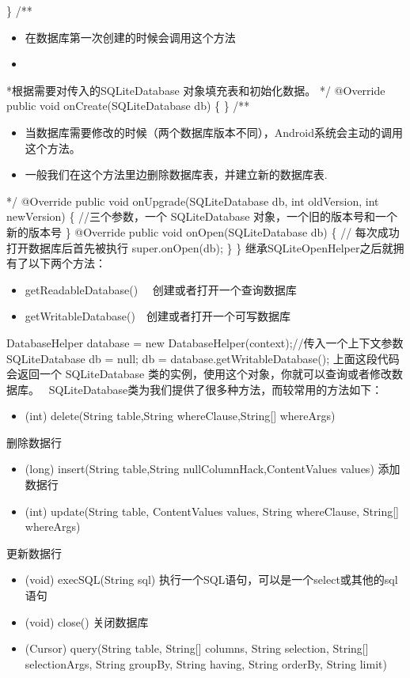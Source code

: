 \documentclass[9pt, b5paper]{article}
\begin{document}
\}
/**
\begin{itemize}
\item 在数据库第一次创建的时候会调用这个方法
\item 
\end{itemize}
 *根据需要对传入的SQLiteDatabase 对象填充表和初始化数据。
 */
@Override
public void onCreate(SQLiteDatabase db) \{
\}
/**
\begin{itemize}
\item 当数据库需要修改的时候（两个数据库版本不同），Android系统会主动的调用这个方法。
\item 一般我们在这个方法里边删除数据库表，并建立新的数据库表.
\end{itemize}
     */
    @Override
    public void onUpgrade(SQLiteDatabase db, int oldVersion, int newVersion) \{
        //三个参数，一个 SQLiteDatabase 对象，一个旧的版本号和一个新的版本号
    \}
    @Override
    public void onOpen(SQLiteDatabase db) \{
        // 每次成功打开数据库后首先被执行
        super.onOpen(db);
    \}
\}
继承SQLiteOpenHelper之后就拥有了以下两个方法：
\begin{itemize}
\item getReadableDatabase() 　创建或者打开一个查询数据库
\item getWritableDatabase()　创建或者打开一个可写数据库
\end{itemize}
DatabaseHelper database = new DatabaseHelper(context);//传入一个上下文参数
SQLiteDatabase db = null;
db = database.getWritableDatabase();
上面这段代码会返回一个 SQLiteDatabase 类的实例，使用这个对象，你就可以查询或者修改数据库。　
SQLiteDatabase类为我们提供了很多种方法，而较常用的方法如下：
\begin{itemize}
\item (int) delete(String table,String whereClause,String[] whereArgs)
\end{itemize}
删除数据行
\begin{itemize}
\item (long) insert(String table,String nullColumnHack,ContentValues values)
添加数据行
\item (int) update(String table, ContentValues values, String whereClause, String[] whereArgs)
\end{itemize}
更新数据行
\begin{itemize}
\item (void) execSQL(String sql)
执行一个SQL语句，可以是一个select或其他的sql语句
\item (void) close()
关闭数据库
\item (Cursor) query(String table, String[] columns, String selection, String[] selectionArgs, String groupBy, String having, String orderBy, String limit)
\end{itemize}
\end{document}
